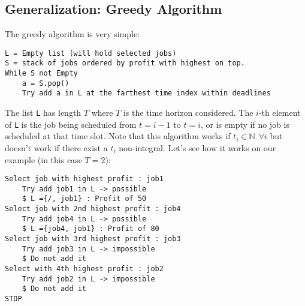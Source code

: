 %

\subsection{Generalization: Greedy Algorithm}

The greedy algorithm is very simple:

\begin{lstlisting}[label={list:c6:SchedulingGreedy},caption=Pseudo-code of the greedy algorithm for scheduling problem]
L = Empty list (will hold selected jobs)
S = stack of jobs ordered by profit with highest on top.
While S not Empty
	a = S.pop()
	Try add a in L at the farthest time index within deadlines
\end{lstlisting}

The list \texttt{L} has length $T$ where $T$ is the time horizon considered. The $i$-th element of \texttt{L} is the job being scheduled from $t = i-1$ to $t = i$, or is empty if no job is scheduled at that time slot. Note that this algorithm works if $t_i \in \mathbb{N} \: \: \forall i$ but doesn’t work if there exist a $t_i$ non-integral. Let's see how it works on our example (in this case $T = 2$):

\begin{lstlisting}[label={list:c6:SchedulingGreedy_Example},caption=Example of the greedy algorithm for scheduling problem]
Select job with highest profit : job1
	Try add job1 in L -> possible
	$ L ={/, job1} : Profit of 50
Select job with 2nd highest profit : job4
	Try add job4 in L -> possible
	$ L ={job4, job1} : Profit of 80
Select job with 3rd highest profit : job3
	Try add job3 in L -> impossible
	$ Do not add it
Select with 4th highest profit : job2
	Try add job2 in L -> impossible
	$ Do not add it
STOP
\end{lstlisting}

